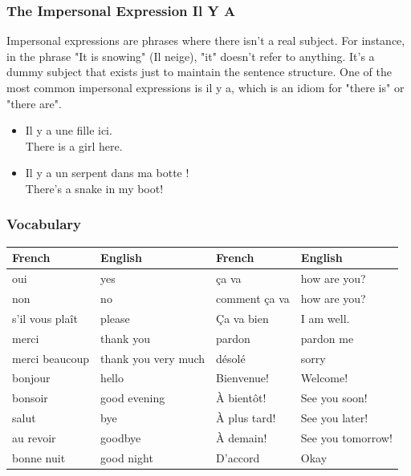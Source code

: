 \subsubsection{The Impersonal Expression Il Y A}

Impersonal expressions are phrases where there isn't a real subject. For instance, in the phrase "It is snowing" (Il neige), "it" doesn't refer to anything. It's a dummy subject that exists just to maintain the sentence structure.  One of the most common impersonal expressions is il y a, which is an idiom for "there is" or "there are".

\begin{itemize}
  \item  Il y a une fille ici. \\ There is a girl here.
  \item  Il y a un serpent dans ma botte ! \\ There's a snake in my boot!
\end{itemize}

\subsubsection{Vocabulary}

\begin{center}\begin{tabular}{l|l||l|l}
\textbf{French} & \textbf{English} & \textbf{French} & \textbf{English} \\ \hline
oui & yes & {\c c}a va & how are you? \\
non & no & comment {\c c}a va & how are you? \\
s'il vous pla{\^i}t & please & {\c C}a va bien & I am well. \\
merci & thank you & pardon & pardon me \\
merci beaucoup & thank you very much & d{\' e}sol{\' e} & sorry \\
bonjour & hello & Bienvenue! & Welcome! \\
bonsoir & good evening & {\`A} bient{\^o}t! & See you soon! \\
salut & bye & {\`A} plus tard! & See you later! \\
au revoir & goodbye & {\`A} demain! & See you tomorrow! \\
bonne nuit & good night & D'accord & Okay \\
\end{tabular}\end{center}

